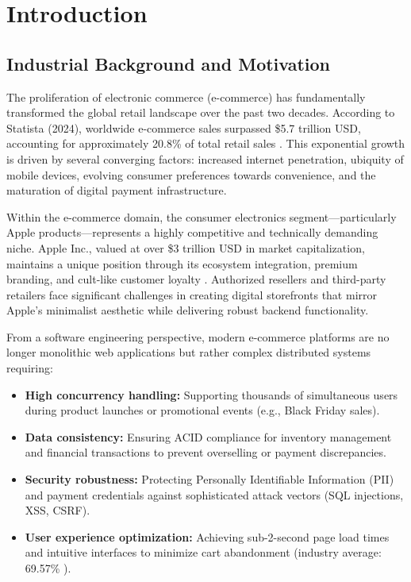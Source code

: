 
\chapter{Introduction}

\section{Industrial Background and Motivation}

The proliferation of electronic commerce (e-commerce) has fundamentally transformed the global retail landscape over the past two decades. According to Statista (2024), worldwide e-commerce sales surpassed \$5.7 trillion USD, accounting for approximately 20.8\% of total retail sales \cite{statista2024}. This exponential growth is driven by several converging factors: increased internet penetration, ubiquity of mobile devices, evolving consumer preferences towards convenience, and the maturation of digital payment infrastructure.

Within the e-commerce domain, the consumer electronics segment—particularly Apple products—represents a highly competitive and technically demanding niche. Apple Inc., valued at over \$3 trillion USD in market capitalization, maintains a unique position through its ecosystem integration, premium branding, and cult-like customer loyalty \cite{apple2024}. Authorized resellers and third-party retailers face significant challenges in creating digital storefronts that mirror Apple's minimalist aesthetic while delivering robust backend functionality.

From a software engineering perspective, modern e-commerce platforms are no longer monolithic web applications but rather complex distributed systems requiring:

\begin{itemize}
    \item \textbf{High concurrency handling:} Supporting thousands of simultaneous users during product launches or promotional events (e.g., Black Friday sales).
    \item \textbf{Data consistency:} Ensuring ACID compliance for inventory management and financial transactions to prevent overselling or payment discrepancies.
    \item \textbf{Security robustness:} Protecting Personally Identifiable Information (PII) and payment credentials against sophisticated attack vectors (SQL injections, XSS, CSRF).
   

 \item \textbf{User experience optimization:} Achieving sub-2-second page load times and intuitive interfaces to minimize cart abandonment (industry average: 69.57\% \cite{baymard2023}).
\end{itemize}

